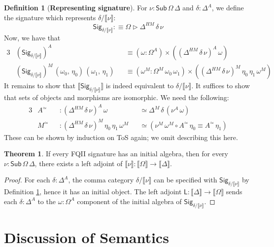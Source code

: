 \documentclass[12pt,a4paper,twoside,openany]{book}
\theoremstyle{remark}
\theoremstyle{definition}
\newtheorem{mydefinition}{Definition}
\theoremstyle{theorem}
\newtheorem{theorem}{Theorem}
\newcommand{\ms}[1]{\mathsf{#1}}
\newcommand{\Sub}{\mathsf{Sub}}
\newcommand{\ext}{\triangleright}
\newcommand{\llb}{\llbracket}
\newcommand{\rrb}{\rrbracket}
\newcommand{\sem}[1]{\llb#1\rrb}
\newcommand{\defn}{:\equiv}
\begin{document}
\begin{mydefinition}[\textbf{Representing signature}]
\label{def:fqii-rep-signature}
\noindent For $\nu : \Sub\,\Omega\,\Delta$ and $\delta : \Delta^A$, we define the
signature which represents $\delta/\sem{\nu}$:
\[
  \ms{Sig}_{\delta/\sem{\nu}} \defn \Omega \ext \Delta^{HM}\,\delta\,\nu
\]
Now, we have that
\begin{alignat*}{3}
  &(\ms{Sig}_{\delta/\sem{\nu}})^A &&\equiv (\omega : \Omega^A) \times ((\Delta^{HM}\,\delta\,\nu)^A\,\omega)\\
  &(\ms{Sig}_{\delta/\sem{\nu}})^M\,(\omega_0,\,\eta_0)\,(\omega_1,\,\eta_1) &&\equiv (\omega^M : \Omega^M\,\omega_0\,\omega_1) \times ((\Delta^{HM}\,\delta\,\nu)^M\,\eta_0\,\eta_1\,\omega^M)
\end{alignat*}
It remains to show that $\sem{\ms{Sig}_{\delta/\sem{\nu}}}$ is indeed equivalent
to $\delta/\sem{\nu}$. It suffices to show that sets of objects and morphisms
are isomorphic. We need the following:
\begin{alignat*}{3}
  & A^{\simeq} &&: (\Delta^{HM}\,\delta\,\nu)^A\,\omega &&\simeq \Delta^M\,\delta\,(\nu^A\,\omega)\\
  & M^{\simeq} &&: (\Delta^{HM}\,\delta\,\nu)^M\,\eta_0\,\eta_1\,\omega^M &&\simeq (\nu^M\,\omega^M \circ A^{\simeq}\,\eta_0 \equiv A^{\simeq}\,\eta_1)
\end{alignat*}
These can be shown by induction on ToS again; we omit describing this here.
\end{mydefinition}

\begin{theorem}
If every FQII signature has an initial algebra, then for every $\nu :
\Sub\,\Omega\,\Delta$, there exists a left adjoint of $\sem{\nu} : \sem{\Omega} \to \sem{\Delta}$.
\end{theorem}
\begin{proof}
For each $\delta : \Delta^A$, the comma category $\delta/\sem{\nu}$ can be
specified with $\ms{Sig}_{\delta/\sem{\nu}}$ by Definition
\ref{def:fqii-rep-signature}, hence it has an initial object. The left adjoint
$\ms{L} : \sem{\Delta} \to \sem{\Omega}$ sends each $\delta : \Delta^A$ to the
$\omega : \Omega^A$ component of the initial algebra of
$\ms{Sig}_{\delta/\sem{\nu}}$.
\end{proof}

\section{Discussion of Semantics}
\end{document}
